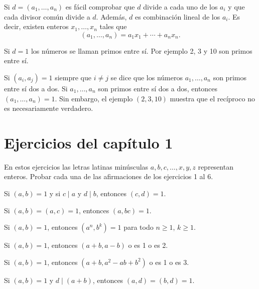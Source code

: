 \documentclass[12pt,a4paper]{book}
\begin{document}
    Si $d=(a_1,\dots,a_n)$ es fácil comprobar que $d$ divide a cada uno de los $a_i$ y que
    cada divisor común divide a $d$. Además, $d$ es combinación lineal de los $a_i$. Es
    decir, existen enteros $x_1,\dots,x_n$ tales que
    \begin{equation*}
        (a_1,\dots,a_n)=a_1x_1+\cdots+a_nx_n.
    \end{equation*}

    Si $d=1$ los números se llaman primos entre sí. Por ejemplo 2, 3 y 10 son primos entre sí.

    Si $(a_i,a_j)=1$ siempre que $i\neq j$ se dice que los números $a_1,\dots,a_n$ son primos
    entre sí dos a dos. Si $a_1,\dots,a_n$ son primos entre sí dos a dos, entonces
    $(a_1,\dots,a_n)=1$. Sin embargo, el ejemplo $(2,3,10)$ muestra que el recíproco no es
    necesariamente verdadero.

    \section*{Ejercicios del capítulo 1}

    En estos ejercicios las letras latinas minúsculas $a,b,c,\dots,x,y,z$ representan
    enteros. Probar cada una de las afirmaciones de los ejercicios 1 al 6.

    \begin{ejercicio}
        Si $(a,b)=1$ y si $c\mid a$ y $d\mid b$, entonces $(c,d)=1$.
    \end{ejercicio}

    \begin{ejercicio}
        Si $(a,b)=(a,c)=1$, entonces $(a,bc)=1$.
    \end{ejercicio}

    \begin{ejercicio}
        Si $(a,b)=1$, entonces $(a^n,b^k)=1$ para todo $n\geq1$, $k\geq1$.
    \end{ejercicio}

    \begin{ejercicio}
        Si $(a,b)=1$, entonces $(a+b,a-b)$ o es 1 o es 2.
    \end{ejercicio}

    \begin{ejercicio}
        Si $(a,b)=1$, entonces $(a+b,a^2-ab+b^2)$ o es 1 o es 3.
    \end{ejercicio}

    \begin{ejercicio}
        Si $(a,b)=1$ y $d\mid(a+b)$, entonces $(a,d)=(b,d)=1$.
    \end{ejercicio}
\end{document}
